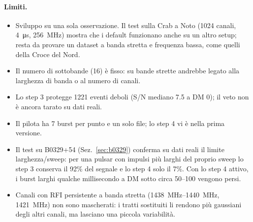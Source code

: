\paragraph{Limiti.}
\begin{itemize}
  \item Sviluppo su una sola osservazione. Il test sulla Crab a Noto (1024 canali, \SI{4}{\micro\second},
    \SI{256}{\mega\hertz}) mostra che i default funzionano anche su un altro setup; resta da provare un dataset a banda
    stretta e frequenza bassa, come quelli della Croce del Nord.
  \item Il numero di sottobande (16) è fisso: su bande strette andrebbe legato alla larghezza di banda o al numero di canali.
  \item Lo step 3 protegge 1221 eventi deboli (S/N mediano 7.5 a DM 0); il veto non è ancora tarato su dati reali.
  \item Il pilota ha 7 burst per punto e un solo file; lo step 4 vi è nella prima versione.
  \item Il test su B0329+54 (Sez.~\ref{sec:b0329}) conferma su dati reali il limite larghezza/sweep: per una pulsar
    con impulsi più larghi del proprio sweep lo step 3 conserva il 92\% del segnale e lo step 4 solo il 7\%. Con lo step 4
    attivo, i burst larghi qualche millisecondo a DM sotto circa 50--100 vengono persi.
  \item Canali con RFI persistente a banda stretta (\SIrange{1438}{1440}{\mega\hertz}, \SI{1421}{\mega\hertz}) non sono
    mascherati: i tratti sostituiti li rendono più gaussiani degli altri canali, ma lasciano una piccola variabilità.
\end{itemize}

